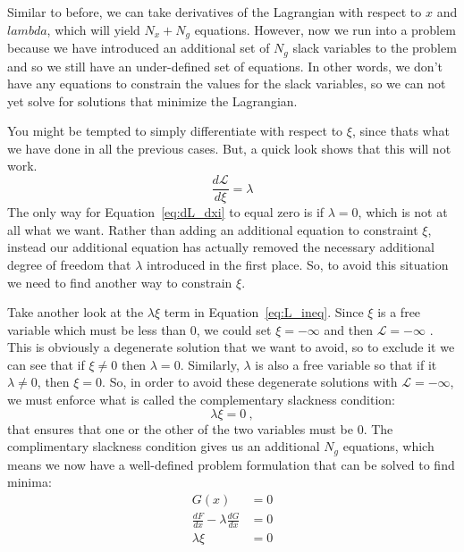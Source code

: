 \documentclass[conf]{new-aiaa}
\begin{document}
        Similar to before, we can take derivatives of the Lagrangian with respect to $x$ and $lambda$, which will yield 
        $N_x+N_g$ equations. 
        However, now we run into a problem because we have introduced an additional set of $N_g$ slack variables to the problem and so we still have an under-defined set of equations. 
        In other words, we don't have any equations to constrain the values for the slack variables, so we can not yet solve for solutions that minimize the Lagrangian. 

        You might be tempted to simply differentiate with respect to $\xi$, since thats what we have done in all the previous cases. 
        But, a quick look shows that this will not work.
        \begin{equation}
            \frac{d\mathcal{L}}{d\xi} = \lambda \label{eq:dL_dxi}
        \end{equation}
        The only way for Equation~\eqref{eq:dL_dxi} to equal zero is if $\lambda=0$, which is not at all what we want. 
        Rather than adding an additional equation to constraint $\xi$, instead our additional equation has actually removed the necessary additional degree of freedom that $\lambda$ introduced in the first place. 
        So, to avoid this situation we need to find another way to constrain $\xi$. 

        Take another look at the $\lambda \xi$ term in Equation~\eqref{eq:L_ineq}. 
        Since $\xi$ is a free variable which must be less than 0, we could set $\xi=-\infty$ and then $\mathcal{L}=-\infty$
        . 
        This is obviously a degenerate solution that we want to avoid, so to exclude it we can see that if $\xi \ne 0$ then $\lambda = 0$. 
        Similarly, $\lambda$ is also a free variable so that if it $\lambda\ne0$, then $\xi=0$. 
        So, in order to avoid these degenerate solutions with $\mathcal{L}=-\infty$, we must enforce what is called the complementary slackness condition: 
        \begin{equation}
            \lambda \xi = 0 \ , 
        \end{equation}
        that ensures that one or the other of the two variables must be 0. 
        The complimentary slackness condition gives us an additional $N_g$ equations, which means we now have a well-defined problem formulation that can be solved to find minima: 
        \begin{align}
            G(x) &= 0 \\
            \frac{dF}{dx} - \lambda \frac{dG}{dx} &= 0 \\
            \lambda \xi &= 0
        \end{align}
\end{document}
